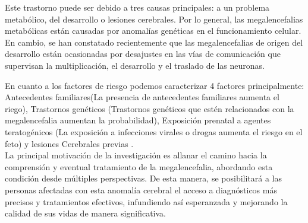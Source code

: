 Este trastorno puede ser debido a tres causas principales: a un problema metabólico, del desarrollo o lesiones cerebrales. Por lo general, las megalencefalias metabólicas están causadas por anomalías genéticas en el funcionamiento celular. En cambio, se han constatado recientemente \cite{winden_megalencephaly_2015} que las megalencefalias de origen del desarrollo están ocasionadas por desajustes en las vías de comunicación que supervisan la multiplicación, el desarrollo y el traslado de las neuronas.

En cuanto a los factores de riesgo podemos caracterizar 4 factores principalmente: Antecedentes familiares(La presencia de antecedentes familiares aumenta el riego), Trastornos genéticos (Trastornos genéticos que estén relacionados con la megalencefalia aumentan la probabilidad), Exposición prenatal a agentes teratogénicos (La exposición a infecciones virales o drogas aumenta el riesgo en el feto) y lesiones Cerebrales previas \cite{winden_megalencephaly_2015}. \\

La principal motivación de la investigación es allanar el camino hacia la comprensión y eventual tratamiento de la megalencefalia, abordando esta condición desde múltiples perspectivas. De esta manera, se posibilitará a las personas afectadas con esta anomalía cerebral el acceso a diagnósticos más precisos y tratamientos efectivos, infundiendo así esperanzada y mejorando la calidad de sus vidas de manera significativa.\\
